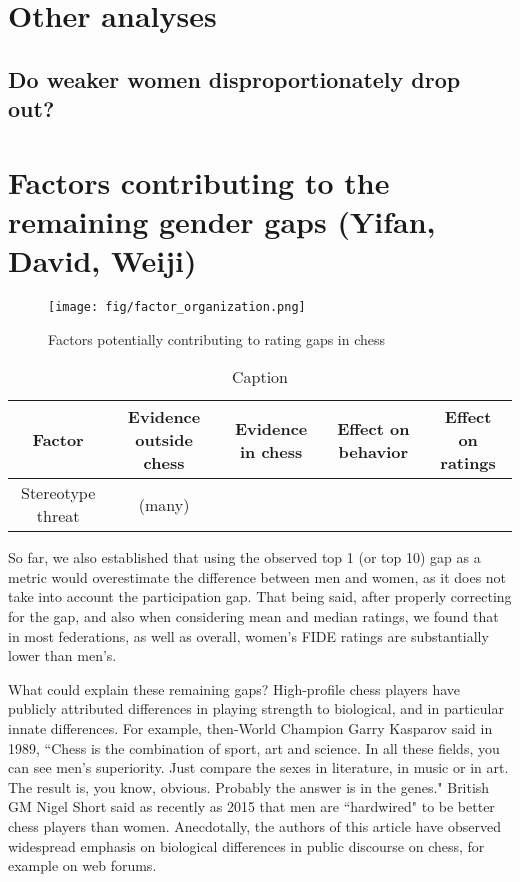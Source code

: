 \section*{Other analyses}
\subsection*{Do weaker women disproportionately drop out?} \cite{chabris2006sex}

\section*{Factors contributing to the remaining gender gaps (Yifan, David, Weiji)}
\begin{figure}
    \centering
    \texttt{[image: fig/factor\_organization.png]}
    \caption{Factors potentially contributing to rating gaps in chess}
    \label{fig:factor_organization}
\end{figure}
\begin{table*}[h!]
    \centering
    \begin{tabular}{|c|c|c|c|c|}
        Factor &  Evidence outside chess & Evidence in chess & Effect on behavior & Effect on ratings\\
        \hline
        Stereotype threat & (many) &  
    \end{tabular}
    \caption{Caption}
    \label{tab:my_label}
\end{table*}



So far, we also established that using the observed top 1 (or top 10) gap as a metric would overestimate the difference between men and women, as it does not take into account the participation gap.  That being said, after properly correcting for the gap, and also when considering mean and median ratings, we found that in most federations, as well as overall, women's FIDE ratings are substantially lower than men's. 

What could explain these remaining gaps? High-profile chess players have publicly attributed differences in playing strength to biological, and in particular innate differences. For example, then-World Champion Garry Kasparov said in 1989, ``Chess is the combination of sport, art and science. In all these fields, you can see men’s superiority. Just compare the sexes in literature, in music or in art. The result is, you know, obvious. Probably the answer is in the genes." British GM Nigel Short said as recently as 2015 that men are ``hardwired" to be better chess players than women. Anecdotally, the authors of this article have observed widespread emphasis on biological differences in public discourse on chess, for example on web forums. 

